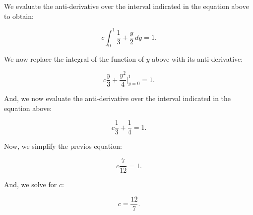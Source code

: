 \documentclass[a5paper,11pt]{article}
\begin{document}
We evaluate the anti-derivative over the
interval indicated in the equation above
to obtain:
 
\begin{equation}
c \int_0^1 \frac{1}{3} + \frac{y}{2} 
\,dy 
= 1.
\end{equation} 

We now replace the integral of the function
of $y$ above with its anti-derivative:

\begin{equation}
c \frac{y}{3} + \frac{y^2}{4} 
\bigg\rvert_{y=0}^1
= 1.
\end{equation} 

And, we now evaluate the anti-derivative
over the interval indicated in the 
equation above:

\begin{equation}
c \frac{1}{3} + \frac{1}{4} 
= 1.
\end{equation} 

Now, we simplify the previos equation:

\begin{equation}
c \frac{7}{12} = 1.
\end{equation} 

And, we solve for $c$:

\begin{equation}
c = \frac{12}{7}.
\end{equation} 




\printbibliography{}
\end{document}
